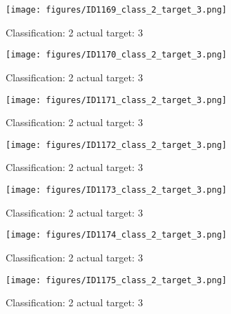\begin{figure}[h!]
\begin{center}
\texttt{[image: figures/ID1169\_class\_2\_target\_3.png]}
\end{center}
\caption{ Classification: 2 actual target: 3}
\label{fig:ID1169_class_2_target_3}
\end{figure}
\begin{figure}[h!]
\begin{center}
\texttt{[image: figures/ID1170\_class\_2\_target\_3.png]}
\end{center}
\caption{ Classification: 2 actual target: 3}
\label{fig:ID1170_class_2_target_3}
\end{figure}
\begin{figure}[h!]
\begin{center}
\texttt{[image: figures/ID1171\_class\_2\_target\_3.png]}
\end{center}
\caption{ Classification: 2 actual target: 3}
\label{fig:ID1171_class_2_target_3}
\end{figure}
\begin{figure}[h!]
\begin{center}
\texttt{[image: figures/ID1172\_class\_2\_target\_3.png]}
\end{center}
\caption{ Classification: 2 actual target: 3}
\label{fig:ID1172_class_2_target_3}
\end{figure}
\begin{figure}[h!]
\begin{center}
\texttt{[image: figures/ID1173\_class\_2\_target\_3.png]}
\end{center}
\caption{ Classification: 2 actual target: 3}
\label{fig:ID1173_class_2_target_3}
\end{figure}
\begin{figure}[h!]
\begin{center}
\texttt{[image: figures/ID1174\_class\_2\_target\_3.png]}
\end{center}
\caption{ Classification: 2 actual target: 3}
\label{fig:ID1174_class_2_target_3}
\end{figure}
\begin{figure}[h!]
\begin{center}
\texttt{[image: figures/ID1175\_class\_2\_target\_3.png]}
\end{center}
\caption{ Classification: 2 actual target: 3}
\label{fig:ID1175_class_2_target_3}
\end{figure}
